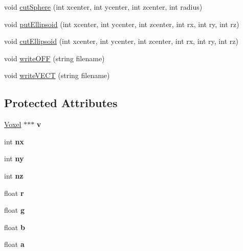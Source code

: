 \begin{DoxyCompactItemize}
void \mbox{\hyperlink{classSculptor_a67ab8c0ba5116adb8af1d01ad373ac15}{cut\+Sphere}} (int xcenter, int ycenter, int zcenter, int radius)
\item 
void \mbox{\hyperlink{classSculptor_a093615b0c2b9b3a17a56300b9b939f39}{put\+Ellipsoid}} (int xcenter, int ycenter, int zcenter, int rx, int ry, int rz)
\item 
void \mbox{\hyperlink{classSculptor_a18d2922c111c4c13653ee07d878151ad}{cut\+Ellipsoid}} (int xcenter, int ycenter, int zcenter, int rx, int ry, int rz)
\item 
void \mbox{\hyperlink{classSculptor_a4faae5ab2d72f2f682005f468e7e8a92}{write\+O\+FF}} (string filename)
\item 
void \mbox{\hyperlink{classSculptor_a200442de17ed45b7a1ece728145a2ddf}{write\+V\+E\+CT}} (string filename)
\end{DoxyCompactItemize}
\subsection*{Protected Attributes}
\begin{DoxyCompactItemize}
\item 
\mbox{\label{classSculptor_a4ca53a2f2fbf41ca42dfe729ebe693f1}} 
\mbox{\hyperlink{structVoxel}{Voxel}} $\ast$$\ast$$\ast$ {\bfseries v}
\item 
\mbox{\label{classSculptor_ad1e32f9042538419a3bc7b376f7813b8}} 
int {\bfseries nx}
\item 
\mbox{\label{classSculptor_a1ce2ff97ec94927928ab3f5ec4ba6761}} 
int {\bfseries ny}
\item 
\mbox{\label{classSculptor_a33204e7df26a7ee4c7192381a24335d3}} 
int {\bfseries nz}
\item 
\mbox{\label{classSculptor_a3f5d2ec3b66d645019b8d81c810a1cd8}} 
float {\bfseries r}
\item 
\mbox{\label{classSculptor_a208c06af69a81a1568df4493868816f1}} 
float {\bfseries g}
\item 
\mbox{\label{classSculptor_a7aafd7305ea634252d8288b60536cd96}} 
float {\bfseries b}
\item 
\mbox{\label{classSculptor_a6fd0157dcf17582f0edd5fddf157604e}} 
float {\bfseries a}
\end{DoxyCompactItemize}


